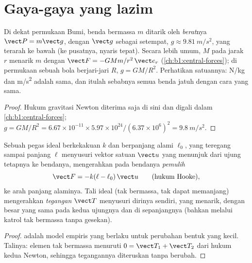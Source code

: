 \section{Gaya-gaya yang lazim}

\begin{proposition}\label{prop:b1:newton-dynamics:weight}
Di dekat permukaan Bumi, benda bermassa $m$ ditarik oleh \emph{berat}nya
$\vect P = m\vect g$, dengan $\vect g$ sebagai  setempat,
$g \approx \qty{9.81}{m/s^2}$, yang terarah ke bawah (ke pusatnya,
nyaris tepat). Secara lebih umum,  $M$ pada jarak $r$ menarik $m$
dengan $\vect F = -GMm/r^2\,\vect e_r$ (\cref{ch:b1:central-forces});
di permukaan sebuah bola berjari-jari $R$, $g = GM/R^2$. Perhatikan
satuannya: \unit{N/kg} dan \unit{m/s^2} adalah sama, dan itulah sebabnya
semua benda jatuh dengan cara yang sama.
\end{proposition}

\begin{proof}
Hukum gravitasi Newton diterima saja di sini dan digali dalam
\cref{ch:b1:central-forces}; $g = GM/R^2 = 6.67\times10^{-11} \times
5.97\times10^{24}/(6.37\times10^6)^2 = \qty{9.8}{m/s^2}$.
\end{proof}

\begin{proposition}\label{prop:b1:newton-dynamics:springstring}
Sebuah pegas ideal berkekakuan $k$ dan berpanjang alami $\ell_0$, yang
teregang sampai panjang $\ell$ menyusuri vektor satuan $\vect u$ yang
menunjuk dari ujung tetapnya ke bendanya, mengerahkan pada bendanya
\emph{ pemulih}
\[
\vect F = -k(\ell - \ell_0)\,\vect u \qquad (\text{hukum Hooke}),
\]
ke arah panjang alaminya. Tali ideal (tak bermassa, tak dapat
memanjang) mengerahkan \emph{tegangan} $\vect T$ menyusuri dirinya
sendiri, yang menarik, dengan besar yang sama pada kedua ujungnya dan di
sepanjangnya (bahkan melalui katrol tak bermassa tanpa gesekan).
\end{proposition}

\begin{proof}
 adalah model empiris yang berlaku untuk perubahan bentuk
yang kecil. Talinya: elemen tak bermassa menuruti
$0 = \vect T_1 + \vect T_2$ dari hukum kedua Newton, sehingga
tegangannya diteruskan tanpa berubah.
\end{proof}

